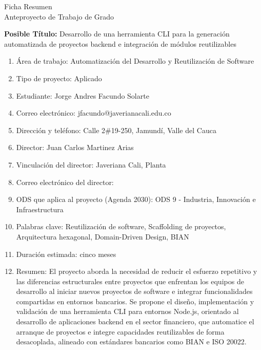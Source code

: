 
\thispagestyle{empty}
\begin{center}
    \Large{Ficha Resumen \\ Anteproyecto de Trabajo de Grado}
\end{center}

\textbf{Posible Título:} Desarrollo de una herramienta CLI para la generación automatizada de proyectos backend e integración de módulos reutilizables
\begin{enumerate}
    \item Área de trabajo: Automatización del Desarrollo y Reutilización de Software
    \item Tipo de proyecto: Aplicado
    \item Estudiante: Jorge Andres Facundo Solarte
    \item Correo electrónico: jfacundo@javerianacali.edu.co
    \item Dirección y teléfono: Calle 2\#19-250, Jamundí, Valle del Cauca
    \item Director: Juan Carlos Martinez Arias
    \item Vinculación del director: Javeriana Cali, Planta
    \item Correo electrónico del director: %
    \item ODS que aplica al proyecto (Agenda 2030): ODS 9 - Industria, Innovación e Infraestructura
    \item Palabras clave: Reutilización de software, Scaffolding de proyectos, Arquitectura hexagonal, Domain-Driven Design, BIAN
    \item Duración estimada: cinco meses
    \item Resumen:  El proyecto aborda la necesidad de reducir el esfuerzo repetitivo y las diferencias estructurales entre proyectos que enfrentan los equipos de desarrollo al iniciar nuevos proyectos de software e integrar funcionalidades compartidas en entornos bancarios. Se propone el diseño, implementación y validación de una herramienta CLI para entornos Node.js, orientado al desarrollo de aplicaciones backend en el sector financiero, que automatice el arranque de proyectos e integre capacidades reutilizables de forma desacoplada, alineado con estándares bancarios como BIAN e ISO 20022.
\end{enumerate}